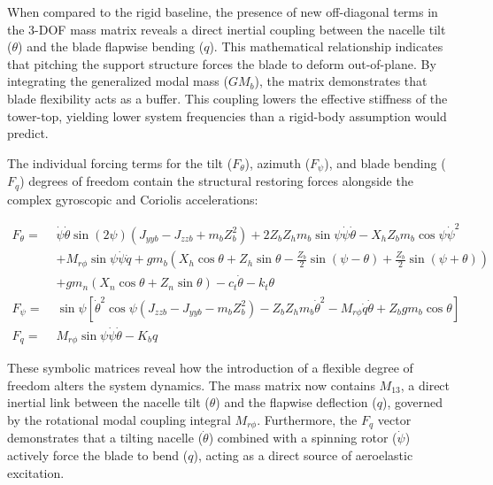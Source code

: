 \documentclass[final,onecolumn]{IEEEtran}
\begin{document}
When compared to the rigid baseline, the presence of new off-diagonal terms in the 3-DOF mass matrix reveals a direct inertial coupling between the nacelle tilt ($\theta$) and the blade flapwise bending ($q$). This mathematical relationship indicates that pitching the support structure forces the blade to deform out-of-plane. By integrating the generalized modal mass ($GM_b$), the matrix demonstrates that blade flexibility acts as a buffer. This coupling lowers the effective stiffness of the tower-top, yielding lower system frequencies than a rigid-body assumption would predict.

The individual forcing terms for the tilt ($F_{\theta}$), azimuth ($F_{\psi}$), and blade bending ($F_{q}$) degrees of freedom contain the structural restoring forces alongside the complex gyroscopic and Coriolis accelerations:

\begin{align*}
    F_{\theta} =\; & \dot{\psi}\dot{\theta}\sin{(2\psi)}(J_{yyb} - J_{zzb} + m_b Z_b^2) + 2 Z_b Z_h m_b \sin{\psi} \dot{\psi}\dot{\theta} - X_h Z_b m_b \cos{\psi} \dot{\psi}^2                     \\
                   & + M_{r\phi} \sin{\psi} \dot{\psi} \dot{q} + g m_b \left( X_h \cos{\theta} + Z_h \sin{\theta} - \frac{Z_b}{2}\sin{(\psi - \theta)} + \frac{Z_b}{2}\sin{(\psi + \theta)} \right) \\
                   & + g m_n (X_n \cos{\theta} + Z_n \sin{\theta}) - c_t \dot{\theta} - k_t \theta                                                                                                  \\[1em]
    F_{\psi} =\;   & \sin{\psi} \left[ \dot{\theta}^2 \cos{\psi}(J_{zzb} - J_{yyb} - m_b Z_b^2) - Z_b Z_h m_b \dot{\theta}^2 - M_{r\phi} \dot{q} \dot{\theta} + Z_b g m_b \cos{\theta} \right]      \\[1em]
    F_{q} =\;      & M_{r\phi} \sin{\psi} \dot{\psi} \dot{\theta} - K_{b} q
\end{align*}

These symbolic matrices reveal how the introduction of a flexible degree of freedom alters the system dynamics. The mass matrix now contains $M_{13}$, a direct inertial link between the nacelle tilt ($\theta$) and the flapwise deflection ($q$), governed by the rotational modal coupling integral $M_{r\phi}$. Furthermore, the $F_q$ vector demonstrates that a tilting nacelle ($\dot{\theta}$) combined with a spinning rotor ($\dot{\psi}$) actively force the blade to bend ($q$), acting as a direct source of aeroelastic excitation.
\end{document}
